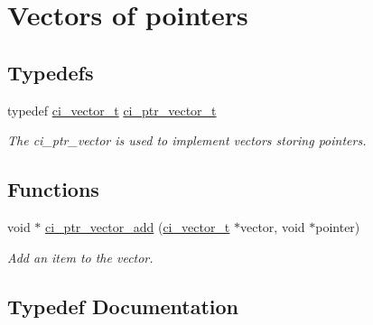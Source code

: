 \hypertarget{group__PTR__VECTORS}{
\section{Vectors of pointers}
\label{group__PTR__VECTORS}
}
\subsection*{Typedefs}
\begin{DoxyCompactItemize}
\item 
typedef \hyperlink{group__VECTORS_ga911840034b768c5380eba22ad04d3c66}{ci\_\-vector\_\-t} \hyperlink{group__PTR__VECTORS_gaa3da76c4b33b554cbec21bfd67793c3b}{ci\_\-ptr\_\-vector\_\-t}
\begin{DoxyCompactList}\small\item\em The ci\_\-ptr\_\-vector is used to implement vectors storing pointers. \item\end{DoxyCompactList}\end{DoxyCompactItemize}
\subsection*{Functions}
\begin{DoxyCompactItemize}
\item 
void $\ast$ \hyperlink{group__PTR__VECTORS_gabbfd158c73af5c35cca903c8f7727434}{ci\_\-ptr\_\-vector\_\-add} (\hyperlink{group__VECTORS_ga911840034b768c5380eba22ad04d3c66}{ci\_\-vector\_\-t} $\ast$vector, void $\ast$pointer)
\begin{DoxyCompactList}\small\item\em Add an item to the vector. \item\end{DoxyCompactList}\end{DoxyCompactItemize}


\subsection{Typedef Documentation}
\hypertarget{group__PTR__VECTORS_gaa3da76c4b33b554cbec21bfd67793c3b}{
\subsubsection[{ci\_\-ptr\_\-vector\_\-t}]{}}
\label{group__PTR__VECTORS_gaa3da76c4b33b554cbec21bfd67793c3b}



